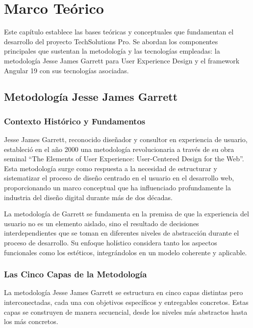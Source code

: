 \chapter{Marco Teórico}
\label{cp:marco-teorico}

Este capítulo establece las bases teóricas y conceptuales que fundamentan el desarrollo del proyecto TechSolutions Pro. Se abordan los componentes principales que sustentan la metodología y las tecnologías empleadas: la metodología Jesse James Garrett para User Experience Design y el framework Angular 19 con sus tecnologías asociadas.

\section{Metodología Jesse James Garrett}

\subsection{Contexto Histórico y Fundamentos}

Jesse James Garrett, reconocido diseñador y consultor en experiencia de usuario, estableció en el año 2000 una metodología revolucionaria a través de su obra seminal ``The Elements of User Experience: User-Centered Design for the Web''. Esta metodología surge como respuesta a la necesidad de estructurar y sistematizar el proceso de diseño centrado en el usuario en el desarrollo web, proporcionando un marco conceptual que ha influenciado profundamente la industria del diseño digital durante más de dos décadas.

La metodología de Garrett se fundamenta en la premisa de que la experiencia del usuario no es un elemento aislado, sino el resultado de decisiones interdependientes que se toman en diferentes niveles de abstracción durante el proceso de desarrollo. Su enfoque holístico considera tanto los aspectos funcionales como los estéticos, integrándolos en un modelo coherente y aplicable.

\subsection{Las Cinco Capas de la Metodología}

La metodología Jesse James Garrett se estructura en cinco capas distintas pero interconectadas, cada una con objetivos específicos y entregables concretos. Estas capas se construyen de manera secuencial, desde los niveles más abstractos hasta los más concretos.

